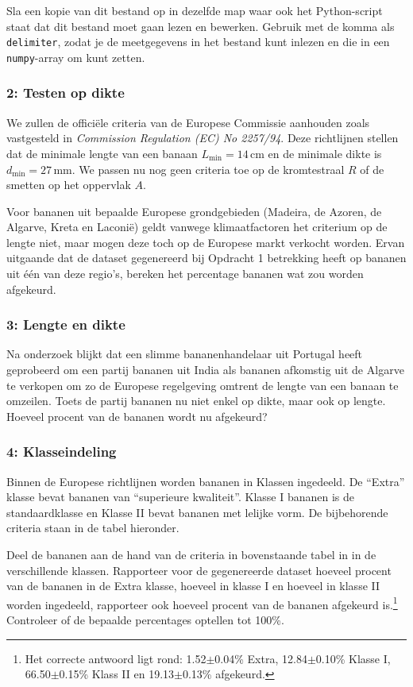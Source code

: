 \documentclass[a4paper,11pt, fleqn]{article}
\begin{document}
Sla een kopie van dit bestand op in dezelfde map waar ook het Python-script staat dat dit bestand moet gaan lezen en bewerken.
Gebruik  met de komma als \verb,delimiter,, zodat je de meetgegevens in het bestand kunt inlezen en die in een \verb,numpy,-array om kunt zetten.

\subsubsection*{2: Testen op dikte}
We zullen de offici\"ele criteria van de Europese Commissie aanhouden zoals vastgesteld in \emph{Commission Regulation (EC) No 2257/94}. Deze richtlijnen stellen dat de minimale lengte van een banaan $L_\textrm{min} = 14\,\textrm{cm}$ en de minimale dikte is $d_\textrm{min} = 27\,\textrm{mm}$. We passen nu nog geen criteria toe op de kromtestraal $R$ of de smetten op het oppervlak $A$.

Voor bananen uit bepaalde Europese grondgebieden (Madeira, de Azoren, de Algarve, Kreta en Laconi\"e) geldt vanwege klimaatfactoren het criterium op de lengte niet, maar mogen deze toch op de Europese markt verkocht worden. Ervan uitgaande dat de dataset gegenereerd bij Opdracht 1 betrekking heeft op bananen uit \'e\'en van deze regio's, bereken het percentage bananen wat zou worden afgekeurd.

\subsubsection*{3: Lengte en dikte}
Na onderzoek blijkt dat een slimme bananenhandelaar uit Portugal heeft geprobeerd om een partij bananen uit India als bananen afkomstig uit de Algarve te verkopen om zo de Europese regelgeving omtrent de lengte van een banaan te omzeilen. Toets de partij bananen nu niet enkel op dikte, maar ook op lengte. Hoeveel procent van de bananen wordt nu afgekeurd?

\subsubsection*{4: Klasseindeling}
Binnen de Europese richtlijnen worden bananen in Klassen ingedeeld. De ``Extra'' klasse bevat bananen van ``superieure kwaliteit''. Klasse I bananen is de standaardklasse en Klasse II bevat bananen met lelijke vorm. De bijbehorende criteria staan in de tabel hieronder.

Deel de bananen aan de hand van de criteria in bovenstaande tabel in in de verschillende klassen. Rapporteer voor de gegenereerde dataset hoeveel procent van de bananen in de Extra klasse, hoeveel in klasse I en hoeveel in klasse II worden ingedeeld, rapporteer ook hoeveel procent van de bananen afgekeurd is.\footnote{Het correcte antwoord ligt rond: 1.52$\pm$0.04\% Extra, 12.84$\pm$0.10\% Klasse I, 66.50$\pm$0.15\% Klass II en 19.13$\pm$0.13\% afgekeurd.} Controleer of de bepaalde percentages optellen tot 100\%.
\end{document}
